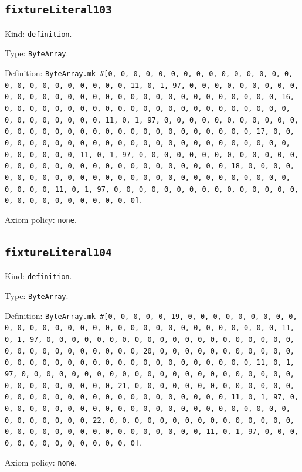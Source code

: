 \documentclass[11pt]{article}
\begin{document}
\subsection*{\texttt{fixtureLiteral103}}
\noindent Kind: \texttt{definition}.\par
\noindent Type: \texttt{ByteArray}.\par
\noindent Definition: \texttt{ByteArray.mk \#[0, 0, 0, 0, 0, 0, 0, 0, 0, 0, 0, 0, 0, 0, 0, 0, 0, 0, 0, 0, 0, 0, 0, 0, 0, 11, 0, 1, 97, 0, 0, 0, 0, 0, 0, 0, 0, 0, 0, 0, 0, 0, 0, 0, 0, 0, 0, 0, 0, 0, 0, 0, 0, 0, 0, 0, 0, 0, 0, 0, 16, 0, 0, 0, 0, 0, 0, 0, 0, 0, 0, 0, 0, 0, 0, 0, 0, 0, 0, 0, 0, 0, 0, 0, 0, 0, 0, 0, 0, 0, 0, 0, 11, 0, 1, 97, 0, 0, 0, 0, 0, 0, 0, 0, 0, 0, 0, 0, 0, 0, 0, 0, 0, 0, 0, 0, 0, 0, 0, 0, 0, 0, 0, 0, 0, 0, 0, 17, 0, 0, 0, 0, 0, 0, 0, 0, 0, 0, 0, 0, 0, 0, 0, 0, 0, 0, 0, 0, 0, 0, 0, 0, 0, 0, 0, 0, 0, 0, 0, 11, 0, 1, 97, 0, 0, 0, 0, 0, 0, 0, 0, 0, 0, 0, 0, 0, 0, 0, 0, 0, 0, 0, 0, 0, 0, 0, 0, 0, 0, 0, 0, 0, 0, 0, 18, 0, 0, 0, 0, 0, 0, 0, 0, 0, 0, 0, 0, 0, 0, 0, 0, 0, 0, 0, 0, 0, 0, 0, 0, 0, 0, 0, 0, 0, 0, 0, 11, 0, 1, 97, 0, 0, 0, 0, 0, 0, 0, 0, 0, 0, 0, 0, 0, 0, 0, 0, 0, 0, 0, 0, 0, 0, 0, 0, 0, 0]}.\par
\noindent Axiom policy: \texttt{none}.\par
\subsection*{\texttt{fixtureLiteral104}}
\noindent Kind: \texttt{definition}.\par
\noindent Type: \texttt{ByteArray}.\par
\noindent Definition: \texttt{ByteArray.mk \#[0, 0, 0, 0, 0, 19, 0, 0, 0, 0, 0, 0, 0, 0, 0, 0, 0, 0, 0, 0, 0, 0, 0, 0, 0, 0, 0, 0, 0, 0, 0, 0, 0, 0, 0, 0, 0, 11, 0, 1, 97, 0, 0, 0, 0, 0, 0, 0, 0, 0, 0, 0, 0, 0, 0, 0, 0, 0, 0, 0, 0, 0, 0, 0, 0, 0, 0, 0, 0, 0, 0, 0, 20, 0, 0, 0, 0, 0, 0, 0, 0, 0, 0, 0, 0, 0, 0, 0, 0, 0, 0, 0, 0, 0, 0, 0, 0, 0, 0, 0, 0, 0, 0, 0, 11, 0, 1, 97, 0, 0, 0, 0, 0, 0, 0, 0, 0, 0, 0, 0, 0, 0, 0, 0, 0, 0, 0, 0, 0, 0, 0, 0, 0, 0, 0, 0, 0, 0, 0, 21, 0, 0, 0, 0, 0, 0, 0, 0, 0, 0, 0, 0, 0, 0, 0, 0, 0, 0, 0, 0, 0, 0, 0, 0, 0, 0, 0, 0, 0, 0, 0, 11, 0, 1, 97, 0, 0, 0, 0, 0, 0, 0, 0, 0, 0, 0, 0, 0, 0, 0, 0, 0, 0, 0, 0, 0, 0, 0, 0, 0, 0, 0, 0, 0, 0, 0, 22, 0, 0, 0, 0, 0, 0, 0, 0, 0, 0, 0, 0, 0, 0, 0, 0, 0, 0, 0, 0, 0, 0, 0, 0, 0, 0, 0, 0, 0, 0, 0, 11, 0, 1, 97, 0, 0, 0, 0, 0, 0, 0, 0, 0, 0, 0, 0, 0, 0]}.\par
\noindent Axiom policy: \texttt{none}.\par
\end{document}
